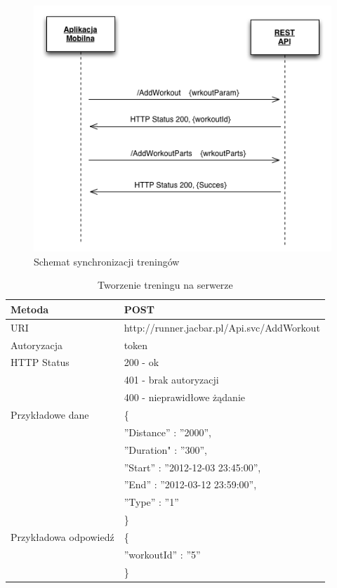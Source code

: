 \begin{figure}[ht]
	\centering
		\includegraphics[width=1\linewidth]{assets/workout_parts.png}
		\caption{Schemat synchronizacji treningów}
	\label{fig:workout_parts}
\end{figure}

\begin{table}
 \label{workout}
  \caption{Tworzenie treningu na serwerze}
  \begin{center}
  \begin{tabular}{| l | l |}
  	\hline
  	Metoda & POST \\ \hline
  	URI & http://runner.jacbar.pl/Api.svc/AddWorkout \\ \hline
  	Autoryzacja & token \\ \hline
  	HTTP Status & 200 - ok \\
                & 401 - brak autoryzacji \\
                & 400 - nieprawidłowe żądanie \\ \hline
    Przykładowe dane & \{ \\
    								 & \quad ''Distance'' : ''2000'', \\
    								 & \quad ''Duration" : ''300'', \\
    								 & \quad ''Start'' : ''2012-12-03 23:45:00'', \\
    								 & \quad ''End'' : ''2012-03-12 23:59:00'', \\
    								 & \quad ''Type'' : ''1'' \\ 
    								 & \} \\ \hline
    Przykładowa odpowiedź & \{ \\
                          & \quad ''workoutId'' : ''5'' \\
                          & \} \\ \hline
  \end{tabular}
  \end{center}
\end{table}


